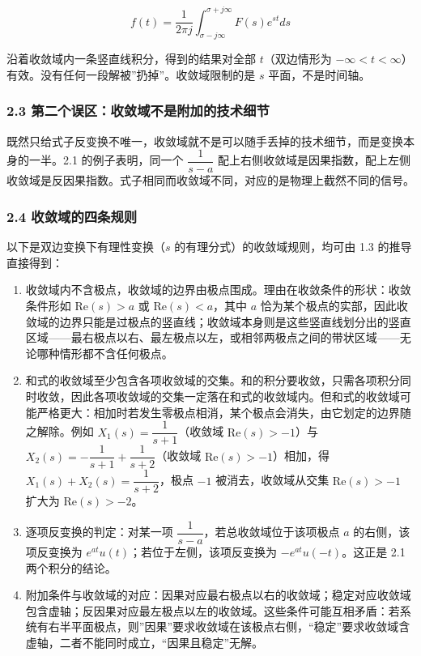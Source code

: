 \documentclass[12pt]{ctexart}
\providecommand{\tightlist}{\setlength{\itemsep}{0pt}\setlength{\parskip}{0pt}}
\begin{document}
\[
f(t)=\frac{1}{2\pi j}\int_{\sigma-j\infty}^{\sigma+j\infty}F(s)e^{st}ds
\]

沿着收敛域内一条竖直线积分，得到的结果对全部 \(t\)（双边情形为
\(-\infty<t<\infty\)）有效。没有任何一段解被''扔掉''。收敛域限制的是
\(s\) 平面，不是时间轴。

\hypertarget{ux7b2cux4e8cux4e2aux8befux533aux6536ux655bux57dfux4e0dux662fux9644ux52a0ux7684ux6280ux672fux7ec6ux8282}{%
\subsubsection{2.3
第二个误区：收敛域不是附加的技术细节}\label{ux7b2cux4e8cux4e2aux8befux533aux6536ux655bux57dfux4e0dux662fux9644ux52a0ux7684ux6280ux672fux7ec6ux8282}}

既然只给式子反变换不唯一，收敛域就不是可以随手丢掉的技术细节，而是变换本身的一半。2.1
的例子表明，同一个 \(\dfrac{1}{s-a}\)
配上右侧收敛域是因果指数，配上左侧收敛域是反因果指数。式子相同而收敛域不同，对应的是物理上截然不同的信号。

\hypertarget{ux6536ux655bux57dfux7684ux56dbux6761ux89c4ux5219}{%
\subsubsection{2.4
收敛域的四条规则}\label{ux6536ux655bux57dfux7684ux56dbux6761ux89c4ux5219}}

以下是双边变换下有理性变换（\(s\) 的有理分式）的收敛域规则，均可由 1.3
的推导直接得到：

\begin{enumerate}
\def\labelenumi{\arabic{enumi}.}
\tightlist
\item
  收敛域内不含极点，收敛域的边界由极点围成。理由在收敛条件的形状：收敛条件形如
  \(\mathrm{Re}(s)>a\) 或 \(\mathrm{Re}(s)<a\)，其中 \(a\)
  恰为某个极点的实部，因此收敛域的边界只能是过极点的竖直线；收敛域本身则是这些竖直线划分出的竖直区域------最右极点以右、最左极点以左，或相邻两极点之间的带状区域------无论哪种情形都不含任何极点。
\item
  和式的收敛域至少包含各项收敛域的交集。和的积分要收敛，只需各项积分同时收敛，因此各项收敛域的交集一定落在和式的收敛域内。但和式的收敛域可能严格更大：相加时若发生零极点相消，某个极点会消失，由它划定的边界随之解除。例如
  \(X_1(s)=\dfrac{1}{s+1}\)（收敛域 \(\mathrm{Re}(s)>-1\)）与
  \(X_2(s)=-\dfrac{1}{s+1}+\dfrac{1}{s+2}\)（收敛域
  \(\mathrm{Re}(s)>-1\)）相加，得 \(X_1(s)+X_2(s)=\dfrac{1}{s+2}\)，极点
  \(-1\) 被消去，收敛域从交集 \(\mathrm{Re}(s)>-1\) 扩大为
  \(\mathrm{Re}(s)>-2\)。
\item
  逐项反变换的判定：对某一项 \(\dfrac{1}{s-a}\)，若总收敛域位于该项极点
  \(a\) 的右侧，该项反变换为 \(e^{at}u(t)\)；若位于左侧，该项反变换为
  \(-e^{at}u(-t)\)。这正是 2.1 两个积分的结论。
\item
  附加条件与收敛域的对应：因果对应最右极点以右的收敛域；稳定对应收敛域包含虚轴；反因果对应最左极点以左的收敛域。这些条件可能互相矛盾：若系统有右半平面极点，则''因果''要求收敛域在该极点右侧，``稳定''要求收敛域含虚轴，二者不能同时成立，``因果且稳定''无解。
\end{enumerate}
\end{document}
